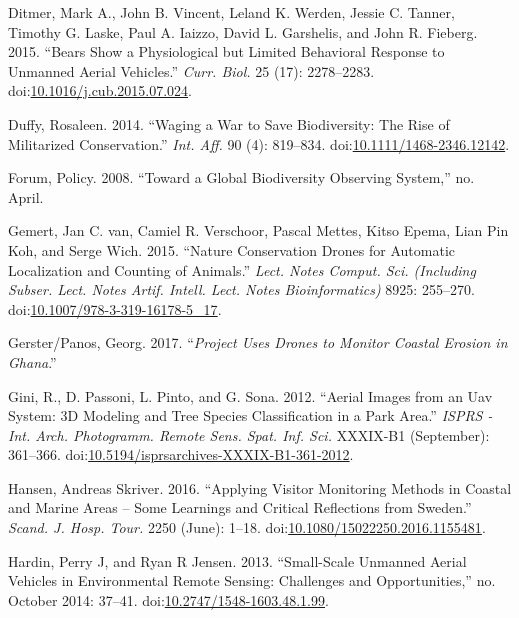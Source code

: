 \documentclass[]{interact}
\theoremstyle{plain}%
\theoremstyle{definition}
\theoremstyle{remark}
\begin{document}
\hypertarget{ref-ditmer_bears_2015}{}
Ditmer, Mark A., John B. Vincent, Leland K. Werden, Jessie C. Tanner,
Timothy G. Laske, Paul A. Iaizzo, David L. Garshelis, and John R.
Fieberg. 2015. ``Bears Show a Physiological but Limited Behavioral
Response to Unmanned Aerial Vehicles.'' \emph{Curr. Biol.} 25 (17):
2278--2283.
doi:\href{https://doi.org/10.1016/j.cub.2015.07.024}{10.1016/j.cub.2015.07.024}.

\hypertarget{ref-duffy_waging_2014}{}
Duffy, Rosaleen. 2014. ``Waging a War to Save Biodiversity: The Rise of
Militarized Conservation.'' \emph{Int. Aff.} 90 (4): 819--834.
doi:\href{https://doi.org/10.1111/1468-2346.12142}{10.1111/1468-2346.12142}.

\hypertarget{ref-forum_toward_2008}{}
Forum, Policy. 2008. ``Toward a Global Biodiversity Observing System,''
no. April.

\hypertarget{ref-van_gemert_nature_2015}{}
Gemert, Jan C. van, Camiel R. Verschoor, Pascal Mettes, Kitso Epema,
Lian Pin Koh, and Serge Wich. 2015. ``Nature Conservation Drones for
Automatic Localization and Counting of Animals.'' \emph{Lect. Notes
Comput. Sci. (Including Subser. Lect. Notes Artif. Intell. Lect. Notes
Bioinformatics)} 8925: 255--270.
doi:\href{https://doi.org/10.1007/978-3-319-16178-5_17}{10.1007/978-3-319-16178-5\_17}.

\hypertarget{ref-Georg2016}{}
Gerster/Panos, Georg. 2017. ``\emph{Project Uses Drones to Monitor
Coastal Erosion in Ghana}.''

\hypertarget{ref-gini_aerial_2012}{}
Gini, R., D. Passoni, L. Pinto, and G. Sona. 2012. ``Aerial Images from
an Uav System: 3D Modeling and Tree Species Classification in a Park
Area.'' \emph{ISPRS - Int. Arch. Photogramm. Remote Sens. Spat. Inf.
Sci.} XXXIX-B1 (September): 361--366.
doi:\href{https://doi.org/10.5194/isprsarchives-XXXIX-B1-361-2012}{10.5194/isprsarchives-XXXIX-B1-361-2012}.

\hypertarget{ref-hansen_applying_2016}{}
Hansen, Andreas Skriver. 2016. ``Applying Visitor Monitoring Methods in
Coastal and Marine Areas -- Some Learnings and Critical Reflections from
Sweden.'' \emph{Scand. J. Hosp. Tour.} 2250 (June): 1--18.
doi:\href{https://doi.org/10.1080/15022250.2016.1155481}{10.1080/15022250.2016.1155481}.

\hypertarget{ref-hardin_small-scale_2013}{}
Hardin, Perry J, and Ryan R Jensen. 2013. ``Small-Scale Unmanned Aerial
Vehicles in Environmental Remote Sensing: Challenges and
Opportunities,'' no. October 2014: 37--41.
doi:\href{https://doi.org/10.2747/1548-1603.48.1.99}{10.2747/1548-1603.48.1.99}.
\end{document}
